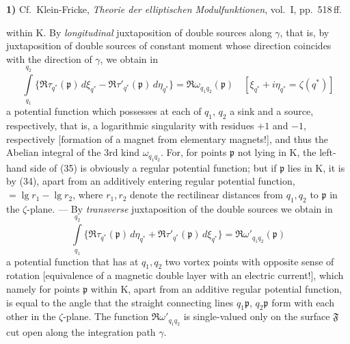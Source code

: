 \documentclass{article}
\begin{document}
\textbf{1)} Cf.\ Klein-Fricke, \emph{Theorie der elliptischen Modulfunktionen}, vol.~I, pp.~518\,ff.

within $\mathrm{K}$. By \emph{longitudinal} juxtaposition of double sources along $\gamma$, that is, by juxtaposition of double sources of constant moment whose direction coincides with the direction of $\gamma$, we obtain in
\[ \int\limits_{q_1}^{q_2} \{ \Re\tau_{q^*}(\mathfrak{p})\,d\xi_{q^*} - \Re\tau'_{q^*}(\mathfrak{p})\,d\eta_{q^*} \} = \Re\omega_{q_1 q_2}(\mathfrak{p}) \quad [\xi_{q^*} + i\eta_{q^*} = \zeta(q^*)] \tag{35} \]
a potential function which possesses at each of $q_1$, $q_2$ a sink and a source, respectively, that is, a logarithmic singularity with residues $+1$ and $-1$, respectively [formation of a magnet from elementary magnets!], and thus the Abelian integral of the 3rd kind $\omega_{q_1 q_2}$. For, for points $\mathfrak{p}$ not lying in $\mathrm{K}$, the left-hand side of (35) is obviously a regular potential function; but if $\mathfrak{p}$ lies in $\mathrm{K}$, it is by (34), apart from an additively entering regular potential function, $= \lg r_1 - \lg r_2$, where $r_1, r_2$ denote the rectilinear distances from $q_1, q_2$ to $\mathfrak{p}$ in the $\zeta$-plane. --- By \emph{transverse} juxtaposition of the double sources we obtain in
\[ \int\limits_{q_1}^{q_2} \{ \Re\tau_{q^*}(\mathfrak{p})\,d\eta_{q^*} + \Re\tau'_{q^*}(\mathfrak{p})\,d\xi_{q^*} \} = \Re\omega'_{q_1 q_2}(\mathfrak{p}) \tag{35'} \]
a potential function that has at $q_1, q_2$ two vortex points with opposite sense of rotation [equivalence of a magnetic double layer with an electric current!], which namely for points $\mathfrak{p}$ within $\mathrm{K}$, apart from an additive regular potential function, is equal to the angle that the straight connecting lines $q_1\mathfrak{p}$, $q_2\mathfrak{p}$ form with each other in the $\zeta$-plane. The function $\Re\omega'_{q_1 q_2}$ is single-valued only on the surface $\mathfrak{F}$ cut open along the integration path $\gamma$.
\end{document}
